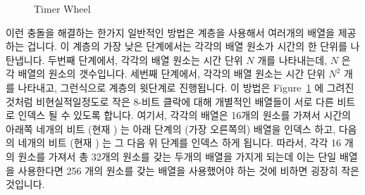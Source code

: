 \begin{figure}[tb]
\centering
{}
\caption{Timer Wheel}
\label{fig:advsync:Timer Wheel}
\end{figure}

이런 충돌을 해결하는 한가지 일반적인 방법은 계층을 사용해서 여러개의 배열을
제공하는 겁니다.
이 계층의 가장 낮은 단계에서는 각각의 배열 원소가 시간의 한 단위를 나탄냅니다.
두번째 단계에서, 각각의 배열 원소는 시간 단위 $N$ 개를 나타내는데, $N$ 은 각
배열의 원소의 갯수입니다.
세번째 단계에서, 각각의 배열 원소는 시간 단위 $N^2$ 개를 나타내고, 그런식으로
계층의 윗단계로 진행됩니다.
이 방법은
Figure~\ref{fig:advsync:Timer Wheel}
에 그려진 것처럼 비현실적일정도로 작은 8-비트 클락에 대해 개별적인 배열들이
서로 다른 비트로 인덱스 될 수 있도록 합니다.
여기서, 각각의 배열은 16개의 원소를 가져서 시간의 아래쪽 네개의 비트 (현재
) 는 아래 단계의 (가장 오른쪽의) 배열을 인덱스 하고, 다음의 네개의 비트
(현재 ) 는 그 다음 위 단계를 인덱스 하게 됩니다.
따라서, 각각 16 개의 원소를 가져서 총 32개의 원소를 갖는 두개의 배열을 가지게
되는데 이는 단일 배열을 사용한다면 256 개의 원소를 갖는 배열을 사용했어야 하는
것에 비하면 굉장히 작은 것입니다.


